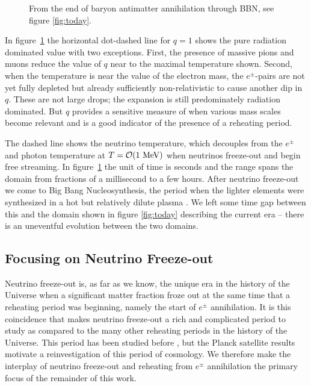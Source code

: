 \begin{figure}
\begin{minipage}{\linewidth}
\caption{From the end of baryon antimatter annihilation through BBN, see figure \ref{fig:today}.%
\label{fig:BBN}  }
\end{minipage}
\end{figure}

 In figure~\ref{fig:BBN} the horizontal dot-dashed line for $q=1$  shows the pure radiation dominated value with two exceptions. First, the presence of massive pions  and muons reduce  the value of $q$ near to the maximal temperature shown.  Second, when the temperature is near the value of the electron mass, the $e^\pm$-pairs are not yet fully depleted but already sufficiently non-relativistic to cause another dip in $q$.  These are not large drops; the expansion is still predominately radiation dominated.  But $q$ provides a sensitive measure of when various mass scales become relevant and is a good indicator of the presence of a reheating period.

 The dashed line shows the neutrino temperature, which decouples from the $e^\pm$ and photon temperature at $T={\cal O}(1\MeV)$ when neutrinos freeze-out and begin free streaming. In figure~\ref{fig:BBN} the unit of time is seconds and the range spans the domain from fractions of a millisecond to a few hours. After neutrino freeze-out we come to Big Bang Nucleosynthesis, the period when the lighter elements were synthesized in a hot but relatively dilute plasma \cite{Iocco:2008va}. We left some time gap between this and the domain shown in figure \ref{fig:today}  describing the current era -- there is an uneventful evolution between the two domains. 

\subsection{Focusing on Neutrino Freeze-out}
Neutrino freeze-out is, as far as we know, the unique era in the history of the Universe when a significant matter fraction froze out at the same time that a reheating period was beginning, namely the start of $e^\pm$ annihilation.  It is this coincidence that makes neutrino freeze-out a rich and complicated period to study as compared to the many other reheating periods in the history of the Universe. This period has been studied before \cite{Madsen,Dolgov_Hansen,Gnedin,Esposito2000,Mangano2002,Mangano2005}, but the Planck satellite results \cite{Planck} motivate a reinvestigation of this period of cosmology.  We therefore make the interplay of neutrino freeze-out and reheating from $e^\pm$ annihilation the primary focus of the remainder of this work.
